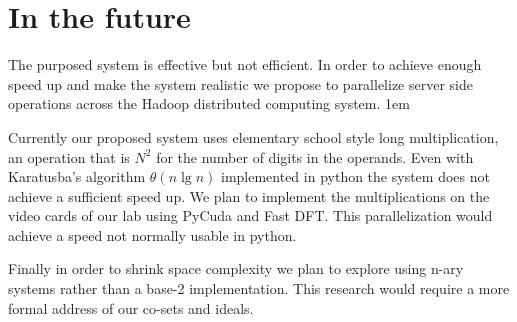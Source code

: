 \documentclass[letterpaper,11pt]{article} %
\begin{document}
\section*{In the future}
\hspace{1em}The purposed system is effective but not efficient. In order to achieve enough speed up and make the system realistic we propose to parallelize server side operations across the Hadoop distributed computing system.
\parskip 1em

\hspace{1em}Currently our proposed system uses elementary school style long multiplication, an operation that is \(N^2\) for the number of digits in the operands. Even with Karatusba's algorithm \(\theta( n \lg n)\) implemented in python the system does not achieve a sufficient speed up. We plan to implement the multiplications on the video cards of our lab using PyCuda and Fast DFT. This parallelization would achieve a speed not normally usable in python.


\hspace{1em}Finally in order to shrink space complexity we plan to explore using n-ary systems rather than a base-2 implementation. This research would require a more formal address of our co-sets and ideals.
\end{document}
